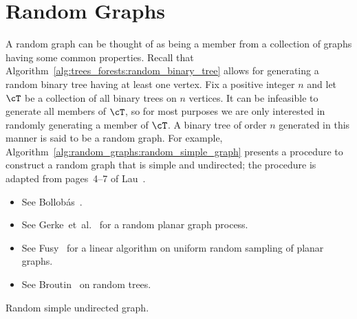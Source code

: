 
\chapter{Random Graphs}
\label{chap:random_graphs}

A random graph can be thought of as being a member
from a collection of graphs having some common properties. Recall that
Algorithm~\ref{alg:trees_forests:random_binary_tree} allows for
generating a random binary tree having at least one vertex. Fix a
positive integer $n$ and let $\cT$ be a collection of all binary trees
on $n$ vertices. It can be infeasible to generate all members of
$\cT$, so for most purposes we are only interested in randomly
generating a member of $\cT$. A binary tree of order $n$ generated in
this manner is said to be a random graph. For
example, Algorithm~\ref{alg:random_graphs:random_simple_graph}
presents a procedure to construct a random graph that is simple and
undirected; the procedure is adapted from pages~4--7 of
Lau~\cite{Lau2007}.

\begin{itemize}
\item See Bollob{\'a}s~\cite{Bollobas2001}.

\item See Gerke~et~al.~\cite{GerkeEtAl2008} for a random planar graph
  process.

\item See Fusy~\cite{Fusy2009} for a linear algorithm on uniform
  random sampling of planar graphs.

\item See Broutin~\cite{Broutin2007} on random trees.
\end{itemize}

\begin{algorithm}[!htbp]

\caption{Random simple undirected graph.}
\label{alg:random_graphs:random_simple_graph}
\end{algorithm}

